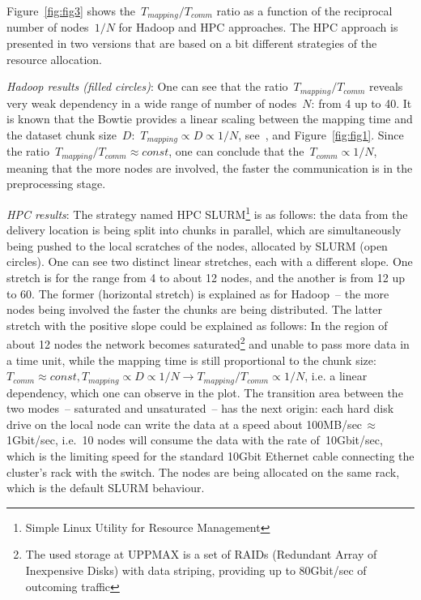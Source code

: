 \documentclass[11pt, oneside]{article}   	%
\begin{document}
Figure~\ref{fig:fig3} shows the~$T_{mapping}/T_{comm}$ ratio as a function of the reciprocal number of nodes~$1/N$ for Hadoop and HPC approaches. The HPC approach is presented in two versions that are based on a bit different strategies of the resource allocation.  

\textit{Hadoop results (filled circles)}: One can see that the ratio~$T_{mapping}/T_{comm}$ reveals very weak dependency in a wide range of number of nodes~$N$: from 4 up to 40. It is known that the Bowtie provides a linear scaling between the mapping time and the dataset chunk size~$D$:~$T_{mapping}\propto  D\propto 1/N$, see~\cite{bowtie}, and Figure~\ref{fig:fig1}. Since the ratio~$T_{mapping}/T_{comm}\approx const$, one can conclude that the~$T_{comm}\propto 1/N$, meaning that the more nodes are involved, the faster the communication is in the preprocessing stage.

\textit{HPC results}: The strategy named HPC SLURM\footnote{Simple Linux Utility for Resource Management} is as follows: the data from the delivery location is being split into chunks in parallel, which are simultaneously being pushed to the local scratches of the nodes, allocated by SLURM  (open circles). One can see two distinct linear stretches, each with a different slope. One stretch is for the range from 4 to about 12 nodes, and the another is from 12 up to 60. The former (horizontal stretch) is explained as for Hadoop~-- the more nodes being involved the faster the chunks are being distributed. The latter stretch with the positive slope could be explained as follows: In the region of about 12 nodes the network becomes saturated\footnote{The used storage at UPPMAX is a set of RAIDs (Redundant Array of Inexpensive Disks) with data striping, providing up to $80$Gbit/sec of outcoming traffic} and unable to pass more data in a time unit, while the mapping time is still proportional to the chunk size:~$T_{comm}\approx const, T_{mapping}\propto D\propto 1/N \rightarrow T_{mapping}/T_{comm}\propto 1/N$, i.e. a linear dependency, which one can observe in the plot. 
The transition area between the two modes~-- saturated and unsaturated~-- has the next origin: each hard disk drive on the local node can write the data at a speed about 100MB/sec\,$\approx$\,1Gbit/sec, i.e.~10 nodes will consume the data with the rate of~10Gbit/sec, which is the limiting speed for the standard 10Gbit Ethernet cable connecting the cluster's rack with the switch. The nodes are being allocated  on the same rack, which is the default SLURM behaviour. 
\end{document}
